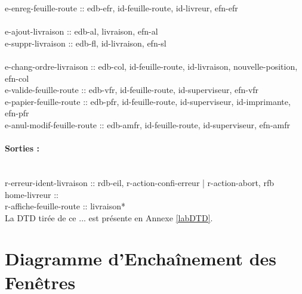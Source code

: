 \documentclass{report}
\begin{document}
e-enreg-feuille-route :: edb-efr, id-feuille-route, id-livreur, efn-efr\\
~~\\
e-ajout-livraison :: edb-al, livraison, efn-al\\
e-suppr-livraison :: edb-fl, id-livraison, efn-sl\\
~~\\
e-chang-ordre-livraison :: edb-col, id-feuille-route, id-livraison, nouvelle-position, efn-col\\
e-valide-feuille-route :: edb-vfr, id-feuille-route, id-superviseur, efn-vfr\\
e-papier-feuille-route :: edb-pfr, id-feuille-route, id-superviseur, id-imprimante, efn-pfr\\
e-anul-modif-feuille-route :: edb-amfr, id-feuille-route, id-superviseur, efn-amfr\\

\paragraph{Sorties :}
~~\\
r-erreur-ident-livraison :: rdb-eil, r-action-confi-erreur | r-action-abort, rfb\\
home-livreur :: \\
r-affiche-feuille-route :: livraison*\\

La DTD tirée de ce ... est présente en Annexe \ref{labDTD}.

\newpage

\section{Diagramme d'Enchaînement des Fenêtres}
\end{document}
